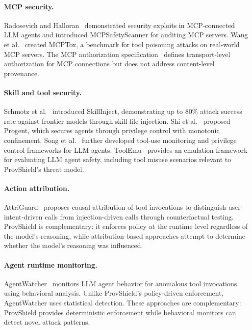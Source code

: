 \documentclass[sigconf,anonymous,review]{acmart}
\begin{document}
\paragraph{MCP security.}
Radosevich and Halloran~\cite{mcp_safety_audit} demonstrated security exploits in MCP-connected LLM agents and introduced MCPSafetyScanner for auditing MCP servers. Wang et al.~\cite{mcptox} created MCPTox, a benchmark for tool poisoning attacks on real-world MCP servers. The MCP authorization specification~\cite{mcp_authorization_spec} defines transport-level authorization for MCP connections but does not address content-level provenance.

\paragraph{Skill and tool security.}
Schmotz et al.~\cite{skillinject} introduced SkillInject, demonstrating up to 80\% attack success rate against frontier models through skill file injection. Shi et al.~\cite{progent} proposed Progent, which secures agents through privilege control with monotonic confinement. Song et al.~\cite{progent} further developed tool-use monitoring and privilege control frameworks for LLM agents. ToolEmu~\cite{toolem} provides an emulation framework for evaluating LLM agent safety, including tool misuse scenarios relevant to ProvShield's threat model.

\paragraph{Action attribution.}
AttriGuard~\cite{attriguard_agentwatcher} proposes causal attribution of tool invocations to distinguish user-intent-driven calls from injection-driven calls through counterfactual testing. ProvShield is complementary: it enforces policy at the runtime level regardless of the model's reasoning, while attribution-based approaches attempt to determine whether the model's reasoning was influenced.

\paragraph{Agent runtime monitoring.}
AgentWatcher~\cite{agentwatcher} monitors LLM agent behavior for anomalous tool invocations using behavioral analysis. Unlike ProvShield's policy-driven enforcement, AgentWatcher uses statistical detection. These approaches are complementary: ProvShield provides deterministic enforcement while behavioral monitors can detect novel attack patterns.
\end{document}
